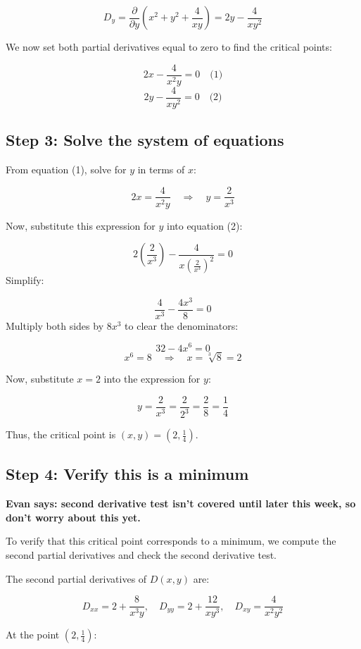 \documentclass[11pt]{article}
\begin{document}
\[
D_y = \frac{\partial}{\partial y} \left( x^2 + y^2 + \frac{4}{xy} \right) = 2y - \frac{4}{xy^2}
\]

We now set both partial derivatives equal to zero to find the critical points:

\[
2x - \frac{4}{x^2y} = 0 \quad \text{(1)}
\]
\[
2y - \frac{4}{xy^2} = 0 \quad \text{(2)}
\]

\newpage

\subsection{Step 3: Solve the system of equations}

From equation (1), solve for \( y \) in terms of \( x \):

\[
2x = \frac{4}{x^2y} \quad \Rightarrow \quad y = \frac{2}{x^3}
\]

Now, substitute this expression for \( y \) into equation (2):

\[
2\left( \frac{2}{x^3} \right) - \frac{4}{x \left( \frac{2}{x^3} \right)^2} = 0
\]
Simplify:

\[
\frac{4}{x^3} - \frac{4x^3}{8} = 0
\]
Multiply both sides by \( 8x^3 \) to clear the denominators:

\[
32 - 4x^6 = 0
\]
\[
x^6 = 8 \quad \Rightarrow \quad x = \sqrt[3]{8} = 2
\]

Now, substitute \( x = 2 \) into the expression for \( y \):

\[
y = \frac{2}{x^3} = \frac{2}{2^3} = \frac{2}{8} = \frac{1}{4}
\]

Thus, the critical point is \( (x, y) = (2, \frac{1}{4}) \).

\newpage

\subsection{Step 4: Verify this is a minimum}
\textbf{Evan says: second derivative test isn't covered until later this week, so don't worry about this yet.}

To verify that this critical point corresponds to a minimum, we compute the second partial derivatives and check the second derivative test.


The second partial derivatives of \( D(x, y) \) are:

\[
D_{xx} = 2 + \frac{8}{x^3y}, \quad D_{yy} = 2 + \frac{12}{xy^3}, \quad D_{xy} = \frac{4}{x^2y^2}
\]

At the point \( (2, \frac{1}{4}) \):
\end{document}
